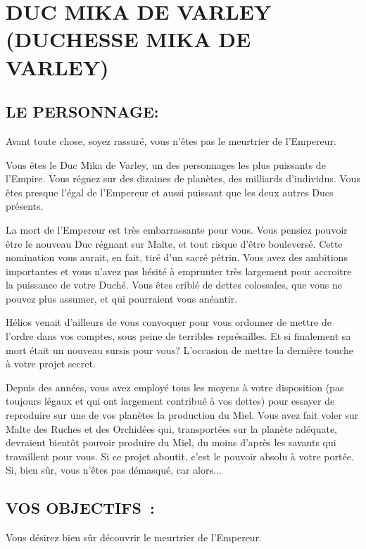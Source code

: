 \documentclass[14pt,twocolumn]{extarticle}
\begin{document}
\section{DUC MIKA DE VARLEY\\(DUCHESSE MIKA DE VARLEY)}

\subsection{LE PERSONNAGE:}

Avant toute chose, soyez rassuré, vous n'êtes pas le meurtrier de l'Empereur.

Vous êtes le Duc Mika de Varley, un des personnages les plus puissants de
l'Empire. Vous régnez sur des dizaines de planètes, des milliards d'individus.
Vous êtes presque l'égal de l'Empereur et aussi puissant que les deux autres
Ducs présents.

La mort de l'Empereur est très embarrassante pour vous. Vous pensiez pouvoir
être le nouveau Duc régnant sur Malte, et tout risque d'être bouleversé. Cette
nomination vous aurait, en fait, tiré d'un sacré pétrin. Vous avez des
ambitions importantes et vous n'avez pas hésité à emprunter très largement pour
accroitre la puissance de votre Duché. Vous êtes criblé de dettes colossales,
que vous ne pouvez plus assumer, et qui pourraient vous anéantir.

Hélios venait d'ailleurs de vous convoquer pour vous ordonner de mettre de
l'ordre dans vos comptes, sous peine de terribles représailles. Et si
finalement sa mort était un nouveau sursis pour vous? L'occasion de mettre la
dernière touche à votre projet secret.

Depuis des années, vous avez employé tous les moyens à votre disposition
(pas toujours légaux et qui ont largement contribué à vos dettes) pour essayer
de reproduire sur une de vos planètes la production du Miel. Vous avez fait
voler sur Malte des Ruches et des Orchidées qui, transportées sur la planète
adéquate, devraient bientôt pouvoir produire du Miel, du moins d'après les
savants qui travaillent pour vous. Si ce projet aboutit, c'est le pouvoir
absolu à votre portée. Si, bien sûr, vous n'êtes pas démasqué, car alors...

\subsection{VOS OBJECTIFS~:}

Vous désirez bien sûr découvrir le meurtrier de l'Empereur.
\end{document}
